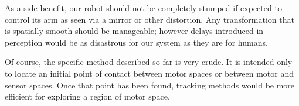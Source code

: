 As a side benefit, our robot should not be completely stumped if
expected to control its arm as seen via a mirror or other distortion.
Any transformation that is spatially smooth should be manageable;
however delays introduced in perception would be as disastrous for our
system as they are for humans.

Of course, the specific method described so far is very crude.  It is
intended only to locate an initial point of contact between motor
spaces or between motor and sensor spaces.  Once that point has been
found, tracking methods would be more efficient for exploring a region
of motor space.













